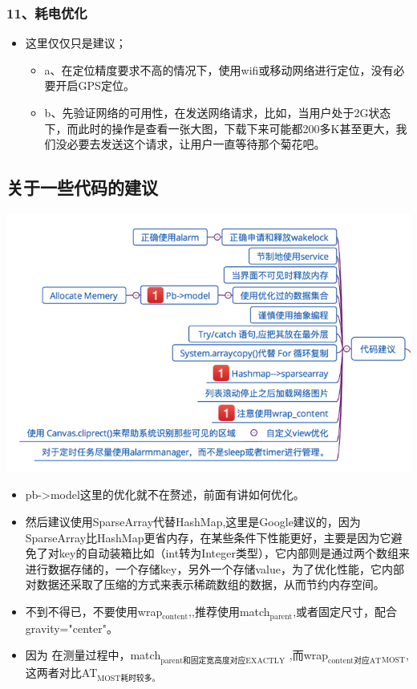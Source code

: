 \documentclass[9pt, b5paper]{article}
\begin{document}
\subsubsection{11、耗电优化}
\label{sec-1-8-11}
\begin{itemize}
\item 这里仅仅只是建议；
\begin{itemize}
\item a、在定位精度要求不高的情况下，使用wifi或移动网络进行定位，没有必要开启GPS定位。
\item b、先验证网络的可用性，在发送网络请求，比如，当用户处于2G状态下，而此时的操作是查看一张大图，下载下来可能都200多K甚至更大，我们没必要去发送这个请求，让用户一直等待那个菊花吧。
\end{itemize}
\end{itemize}
\subsection{关于一些代码的建议}
\label{sec-1-9}

\includegraphics[width=.9\linewidth]{./pic/codeUlti.png}

\begin{itemize}
\item pb->model这里的优化就不在赘述，前面有讲如何优化。
\item 然后建议使用SparseArray代替HashMap,这里是Google建议的，因为SparseArray比HashMap更省内存，在某些条件下性能更好，主要是因为它避免了对key的自动装箱比如（int转为Integer类型），它内部则是通过两个数组来进行数据存储的，一个存储key，另外一个存储value，为了优化性能，它内部对数据还采取了压缩的方式来表示稀疏数组的数据，从而节约内存空间。
\item 不到不得已，不要使用wrap$_{\text{content}}$,,推荐使用match$_{\text{parent}}$,或者固定尺寸，配合gravity="center"。
\item 因为 在测量过程中，match$_{\text{parent和固定宽高度对应EXACTLY}}$ ,而wrap$_{\text{content对应AT}}$$_{\text{MOST}}$,这两者对比AT$_{\text{MOST耗时较多。}}$
\end{itemize}
\end{document}
